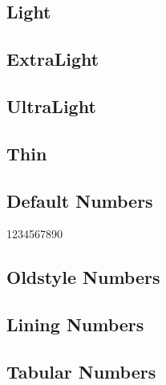 \documentclass{article}
\begin{document}
{\firabook \textit{\lipsum[11]}}

\subsection*{Light}
{\firalight \lipsum[7]}

{\firalight \textit{\lipsum[9]}}

\subsection*{ExtraLight}

{\firaextralight \lipsum[7]}

{\firaextralight \textit{\lipsum[9]}}

\subsection*{UltraLight}

{\firaultralight \lipsum[7]}

{\firaultralight \textit{\lipsum[9]}}

\subsection*{Thin}
{\firathin \lipsum[10]}

{\firathin \textit{\lipsum[12]}}


\subsection*{Default Numbers}

1234567890

\subsection*{Oldstyle Numbers}

{}

\subsection*{Lining Numbers}

{}

\subsection*{Tabular Numbers}

{}
\end{document}
